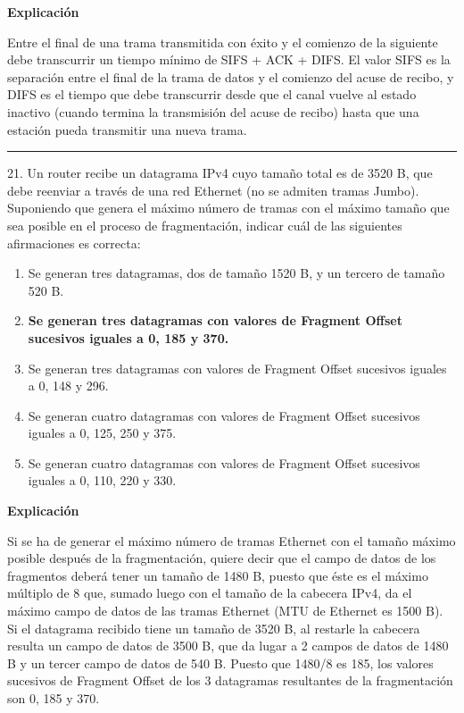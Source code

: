 \documentclass[10pt,a4paper]{article}
\begin{document}
\textbf{Explicación}

Entre el final de una trama transmitida con éxito y el comienzo de la siguiente debe transcurrir un tiempo mínimo de SIFS + ACK + DIFS. El valor SIFS es la separación entre el final de la trama de datos y el comienzo del acuse de recibo, y DIFS es el tiempo que debe transcurrir desde que el canal vuelve al estado inactivo (cuando termina la transmisión del acuse de recibo) hasta que una estación pueda transmitir una nueva trama.

\vspace{15pt} \hrule \vspace{15pt}




21.  Un router recibe un datagrama IPv4 cuyo tamaño total es de 3520 B, que debe reenviar a través de una red Ethernet (no se admiten tramas Jumbo). Suponiendo que genera el máximo número de tramas con el máximo tamaño que sea posible en el proceso de fragmentación, indicar cuál de las siguientes afirmaciones es correcta:

\begin{enumerate}[label=\alph*]
    \item Se generan tres datagramas, dos de tamaño 1520 B, y un tercero de tamaño 520 B.
    \item \textbf{Se generan tres datagramas con valores de Fragment Offset sucesivos iguales a 0, 185 y 370.}
    \item Se generan tres datagramas con valores de Fragment Offset sucesivos iguales a 0, 148 y 296.
    \item Se generan cuatro datagramas con valores de Fragment Offset sucesivos iguales a 0, 125, 250 y 375.
    \item Se generan cuatro datagramas con valores de Fragment Offset sucesivos iguales a 0, 110, 220 y 330.
\end{enumerate}

\textbf{Explicación}

Si se ha de generar el máximo número de tramas Ethernet con el tamaño máximo posible después de la fragmentación, quiere decir que el campo de datos de los fragmentos deberá tener un tamaño de 1480 B, puesto que éste es el máximo múltiplo de 8 que, sumado luego con el tamaño de la cabecera IPv4, da el máximo campo de datos de las tramas Ethernet (MTU de Ethernet es 1500 B). Si el datagrama recibido tiene un tamaño de 3520 B, al restarle la cabecera resulta un campo de datos de 3500 B, que da lugar a 2 campos de datos de 1480 B y un tercer campo de datos de 540 B. Puesto que 1480/8 es 185, los valores sucesivos de Fragment Offset de los 3 datagramas resultantes de la fragmentación son 0, 185 y 370.
\end{document}
